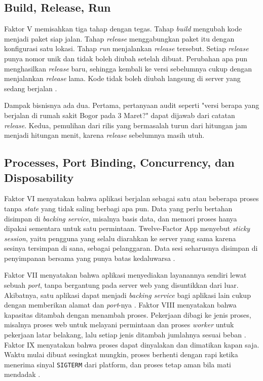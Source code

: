\subsection{Build, Release, Run}

Faktor V memisahkan tiga tahap dengan tegas. Tahap \textit{build} mengubah kode menjadi
paket siap jalan. Tahap \textit{release} menggabungkan paket itu dengan konfigurasi satu
lokasi. Tahap \textit{run} menjalankan \textit{release} tersebut. Setiap \textit{release}
punya nomor unik dan tidak boleh diubah setelah dibuat. Perubahan apa pun menghasilkan
\textit{release} baru, sehingga kembali ke versi sebelumnya cukup dengan menjalankan
\textit{release} lama. Kode tidak boleh diubah langsung di server yang sedang berjalan
\cite{twelvefactor}.

Dampak bisnisnya ada dua. Pertama, pertanyaan audit seperti "versi berapa yang berjalan di
rumah sakit Bogor pada 3 Maret?" dapat dijawab dari catatan \textit{release}. Kedua,
pemulihan dari rilis yang bermasalah turun dari hitungan jam menjadi hitungan menit, karena
\textit{release} sebelumnya masih utuh.

\subsection{Processes, Port Binding, Concurrency, dan Disposability}

Faktor VI menyatakan bahwa aplikasi berjalan sebagai satu atau beberapa proses tanpa
\textit{state} yang tidak saling berbagi apa pun. Data yang perlu bertahan disimpan di
\textit{backing service}, misalnya basis data, dan memori proses hanya dipakai sementara
untuk satu permintaan. Twelve-Factor App menyebut \textit{sticky session}, yaitu pengguna
yang selalu diarahkan ke server yang sama karena sesinya tersimpan di sana, sebagai
pelanggaran. Data sesi seharusnya disimpan di penyimpanan bersama yang punya batas
kedaluwarsa \cite{twelvefactor}.

Faktor VII menyatakan bahwa aplikasi menyediakan layanannya sendiri lewat sebuah
\textit{port}, tanpa bergantung pada server web yang disuntikkan dari luar. Akibatnya, satu
aplikasi dapat menjadi \textit{backing service} bagi aplikasi lain cukup dengan memberikan
alamat dan \textit{port}-nya \cite{twelvefactor}. Faktor VIII menyatakan bahwa kapasitas
ditambah dengan menambah proses. Pekerjaan dibagi ke jenis proses, misalnya proses web untuk
melayani permintaan dan proses \textit{worker} untuk pekerjaan latar belakang, lalu setiap
jenis ditambah jumlahnya sesuai beban \cite{twelvefactor}. Faktor IX menyatakan bahwa proses
dapat dinyalakan dan dimatikan kapan saja. Waktu mulai dibuat sesingkat mungkin, proses
berhenti dengan rapi ketika menerima sinyal \texttt{SIGTERM} dari platform, dan proses tetap
aman bila mati mendadak \cite{twelvefactor}.

